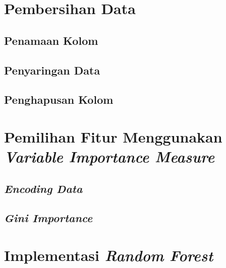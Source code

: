 \documentclass[ugmtesis]{ugmtesis}
\begin{document}
	\section{Pembersihan Data}
	\label{implementasi pembersihan data}
	

		\subsection{Penamaan Kolom}
		\label{implementasi penamaan kolom}
		

		\subsection{Penyaringan Data}
		\label{implementasi penyaringan data}
		

		\subsection{Penghapusan Kolom}
		\label{implementasi penghapusan kolom}
		

	\section{Pemilihan Fitur Menggunakan \textit{Variable Importance Measure}}
	\label{implementasi pemilihan fitur menggunakan variable importance measure}
	

			\subsection{\textit{Encoding Data}}
			\label{implementasi encoding data}
			

			\subsection{\textit{Gini Importance}}
			\label{implementasi gini importance}
			

	\section{Implementasi \textit{Random Forest}}
	\label{implementasi random forest}
	
\end{document}
